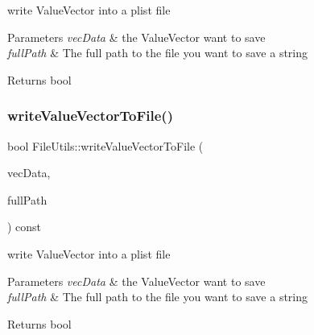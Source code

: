 write Value\+Vector into a plist file


\begin{DoxyParams}{Parameters}
{\em vec\+Data} & the Value\+Vector want to save \\
\hline
{\em full\+Path} & The full path to the file you want to save a string \\
\hline
\end{DoxyParams}
\begin{DoxyReturn}{Returns}
bool 
\end{DoxyReturn}
\mbox{\label{classFileUtils_a05afdedbbee8528bf4237b833789349e}} 
\subsubsection{\texorpdfstring{write\+Value\+Vector\+To\+File()}{writeValueVectorToFile()}\hspace{0.1cm}{\footnotesize\ttfamily [2/3]}}
{\footnotesize\ttfamily bool File\+Utils\+::write\+Value\+Vector\+To\+File (\begin{DoxyParamCaption}\item[{const Value\+Vector \&}]{vec\+Data,  }\item[{const std\+::string \&}]{full\+Path }\end{DoxyParamCaption}) const\hspace{0.3cm}{\ttfamily [virtual]}}

write Value\+Vector into a plist file


\begin{DoxyParams}{Parameters}
{\em vec\+Data} & the Value\+Vector want to save \\
\hline
{\em full\+Path} & The full path to the file you want to save a string \\
\hline
\end{DoxyParams}
\begin{DoxyReturn}{Returns}
bool 
\end{DoxyReturn}
\mbox{\label{classFileUtils_a13c34d3019012ab99be6e04ff199d643}} 
